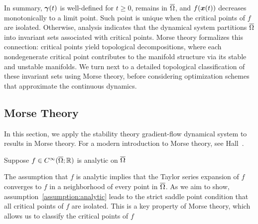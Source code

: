 \documentclass[10pt]{article}
\begin{document}
        \medskip

        In summary, $\bm{\gamma}(t)$ is well-defined for $t \ge 0$, remains in $\overline{\Omega}$, 
        and $f(\bm{x}(t))$ decreases monotonically to a limit point. Such point is unique
        when the critical points of $f$ are isolated. Otherwise, analysis indicates that 
        the dynamical system partitions $\overline{\Omega}$ into invariant sets associated 
        with critical points. Morse theory formalizes this connection: critical points yield 
        topological decompositions, where each nondegenerate critical point contributes to 
        the manifold structure via its stable and unstable manifolds. We turn next 
        to a detailed topological classification of these invariant sets using Morse theory, 
        before considering optimization schemes that approximate the 
        continuous dynamics.

        \bigskip

    \subsection{Morse Theory}
        \label{intro:morse}

        \medskip

        In this section, we apply the stability theory gradient-flow dynamical 
        system to results in Morse theory. For a modern introduction to Morse theory, see Hall~\cite{HallMorseNotes}.
        
        \medskip
        
        \begin{assumption}
            \label{assumption:analytic}
            Suppose $f \in C^\infty(\overline{\Omega}; \mathbb{R})$ is analytic on $\overline{\Omega}$
        \end{assumption}

        \medskip

        The assumption that $f$ is analytic implies that the Taylor series expansion of $f$ converges
        to $f$ in a neighborhood of every point in $\overline{\Omega}$. As we aim to show, assumption~\ref{assumption:analytic}
        leads to the strict saddle point condition that all critical points of $f$ are isolated.
        This is a key property of Morse theory, which allows us to classify the critical points of $f$

        \medskip
        
\end{document}
